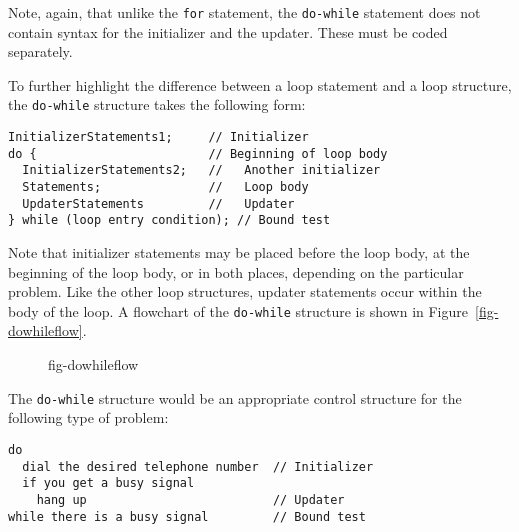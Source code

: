 
\noindent Note, again, that unlike the {\tt for} statement, the {\tt do-while}
statement does not contain syntax for the initializer and the updater.
These must be coded separately.

To further highlight the difference between a loop statement and a
loop structure, the {\tt do-while} structure takes the following
form:

\begin{jjjlisting}
\begin{lstlisting}
InitializerStatements1;     // Initializer
do {                        // Beginning of loop body
  InitializerStatements2;   //   Another initializer
  Statements;               //   Loop body
  UpdaterStatements         //   Updater
} while (loop entry condition); // Bound test
\end{lstlisting}
\end{jjjlisting}

\noindent Note that initializer statements may be placed
before the loop body, at the beginning of the loop body, or in
both places, depending on the particular problem. Like the other loop
structures, updater statements occur within the body of the loop.  A
flowchart of the {\tt do-while} structure is shown in
Figure~\ref{fig-dowhileflow}.

\begin{figure}[t]
 {fig-dowhileflow}

\end{figure}

The {\tt do-while} structure would be an appropriate control structure
for the following type of problem:

\begin{jjjlisting}
\begin{lstlisting}[stringstyle=\color{black}]
do
  dial the desired telephone number  // Initializer
  if you get a busy signal
    hang up                          // Updater
while there is a busy signal         // Bound test
\end{lstlisting}
\end{jjjlisting}

